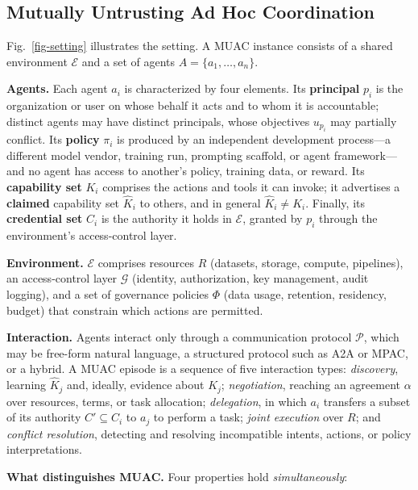 \documentclass[conference]{IEEEtran}
\begin{document}
\subsection{Mutually Untrusting Ad Hoc Coordination}\label{sec-3-1}

Fig.~\ref{fig-setting} illustrates the setting. A MUAC instance consists of a shared environment \(\mathcal{E}\) and a set of agents \(A = \{a_1, \dots, a_n\}\).

\textbf{Agents.} Each agent \(a_i\) is characterized by four elements. Its \textbf{principal} \(p_i\) is the organization or user on whose behalf it acts and to whom it is accountable; distinct agents may have distinct principals, whose objectives \(u_{p_i}\) may partially conflict. Its \textbf{policy} \(\pi_i\) is produced by an independent development process---a different model vendor, training run, prompting scaffold, or agent framework---and no agent has access to another's policy, training data, or reward. Its \textbf{capability set} \(K_i\) comprises the actions and tools it can invoke; it advertises a \textbf{claimed} capability set \(\hat{K}_i\) to others, and in general \(\hat{K}_i \neq K_i\). Finally, its \textbf{credential set} \(C_i\) is the authority it holds in \(\mathcal{E}\), granted by \(p_i\) through the environment's access-control layer.

\textbf{Environment.} \(\mathcal{E}\) comprises resources \(R\) (datasets, storage, compute, pipelines), an access-control layer \(\mathcal{G}\) (identity, authorization, key management, audit logging), and a set of governance policies \(\Phi\) (data usage, retention, residency, budget) that constrain which actions are permitted.

\textbf{Interaction.} Agents interact only through a communication protocol \(\mathcal{P}\), which may be free-form natural language, a structured protocol such as A2A or MPAC, or a hybrid. A MUAC episode is a sequence of five interaction types: \emph{discovery}, learning \(\hat{K}_j\) and, ideally, evidence about \(K_j\); \emph{negotiation}, reaching an agreement \(\alpha\) over resources, terms, or task allocation; \emph{delegation}, in which \(a_i\) transfers a subset of its authority \(C' \subseteq C_i\) to \(a_j\) to perform a task; \emph{joint execution} over \(R\); and \emph{conflict resolution}, detecting and resolving incompatible intents, actions, or policy interpretations.

\textbf{What distinguishes MUAC.} Four properties hold \emph{simultaneously}:
\end{document}
